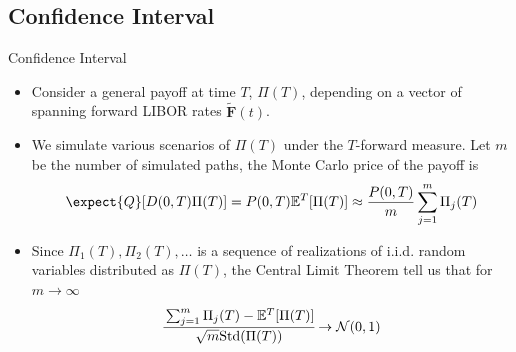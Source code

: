 \documentclass{beamer}
\begin{document}
\subsection{Confidence Interval}
\begin{frame}{Confidence Interval}
	\begin{itemize}
		\item<1-> Consider a general payoff at time $T$, $\Pi(T)$, depending on a vector of spanning forward LIBOR rates $\bm{\tilde{F}}(t)$. %
		\item<2-> We simulate various scenarios of $\Pi(T)$ under the $T$-forward measure. Let $m$ be the number of simulated paths, the Monte Carlo price of the payoff is
		\begin{equation*}
			\expect{Q}[D(0,T)\Pi(T)] = P(0,T)\mathbb{E}^T[\Pi(T)]\approx \frac{P(0,T)}{m}\sum_{j=1}^{m}\Pi_j(T)
		\end{equation*}
		\item<3-> Since $\Pi_1(T), \Pi_2(T),\ldots$ is a sequence of realizations of i.i.d. random variables distributed as $\Pi(T)$, the \textcolor{maincolor}{Central Limit Theorem} tell us that for $m\rightarrow\infty$
		\begin{equation*}
			\cfrac{\sum_{j=1}^{m}\Pi_j(T)-\mathbb{E}^T[\Pi(T)]}{\sqrt{m} \text{Std}(\Pi(T))}\rightarrow \mathcal{N}(0,1)
		\end{equation*}
	\end{itemize}
\end{frame}
\end{document}
